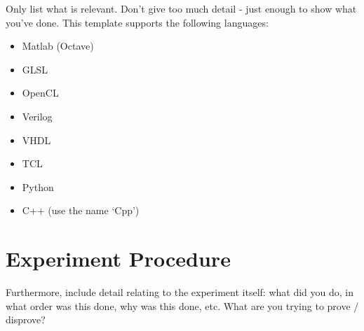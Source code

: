 Only list what is relevant.  Don't give too much detail - just enough to show what you've done.  This template supports the following languages:

\begin{itemize}
  \item Matlab (Octave)
  \item GLSL
  \item OpenCL
  \item Verilog
  \item VHDL
  \item TCL
  \item Python
  \item C++ (use the name `Cpp')
\end{itemize}

\section{Experiment Procedure}

Furthermore, include detail relating to the experiment itself: what did you do, in what order was this done, why was this done, etc.  What are you trying to prove / disprove?
